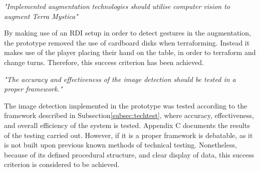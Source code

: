 \textit{"Implemented augmentation technologies should utilise computer vision to augment Terra Mystica"}

By making use of an RDI setup in order to detect gestures in the augmentation, the prototype removed the use of cardboard disks when terraforming. Instead it makes use of the player placing their hand on the table, in order to terraform and change turns. Therefore, this success criterion has been achieved.

\textit{"The accuracy and effectiveness of the image detection should be tested in a proper framework."}

The image detection implemented in the prototype was tested according to the framework described in Subsection\ref{subsec:techtest}, where accuracy, effectiveness, and overall efficiency of the system is tested. Appendix C documents the results of the testing carried out. However, if it is a proper framework is debatable, as it is not built upon previous known methods of technical testing. Nonetheless, because of its defined procedural structure, and clear display of data, this success criterion is considered to be achieved.